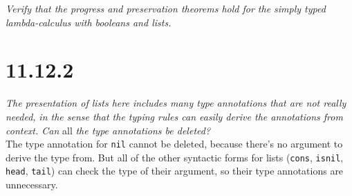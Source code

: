 \documentclass{article}
\newcommand{\ms}[1]{\texttt{#1}}
\theoremstyle{remark}
\begin{document}
    \textit{Verify that the progress and preservation theorems hold for the simply typed lambda-calculus}
    \textit{with booleans and lists.}

\section{11.12.2}

    \textit{The presentation of lists here includes many type annotations that are not really needed,}
    \textit{in the sense that the typing rules can easily derive the annotations from context. Can} all
    \textit{the type annotations be deleted?} \\
    
    The type annotation for \ms{nil} cannot be deleted, because there's no argument to derive the type from.
    But all of the other syntactic forms for lists (\ms{cons}, \ms{isnil}, \ms{head}, \ms{tail}) can check
    the type of their argument, so their type annotations are unnecessary.
\end{document}
